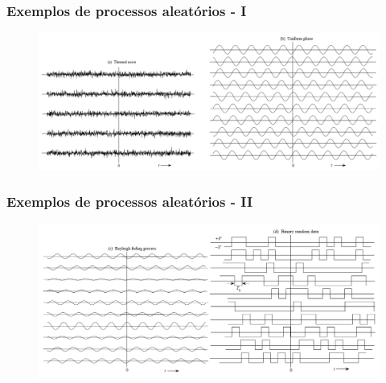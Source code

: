 \begin{frame}
    \frametitle{Exemplos de processos aleatórios - I}

    \begin{figure}[t]
	  \begin{center}
	    \includegraphics[width=0.95\columnwidth]{figs/fig23}
	  \end{center}
	\end{figure}
     
\end{frame}

\begin{frame}
    \frametitle{Exemplos de processos aleatórios - II}

    \begin{figure}[t]
	  \begin{center}
	    \includegraphics[width=0.95\columnwidth]{figs/fig24}
	  \end{center}
	\end{figure}
     
\end{frame}

